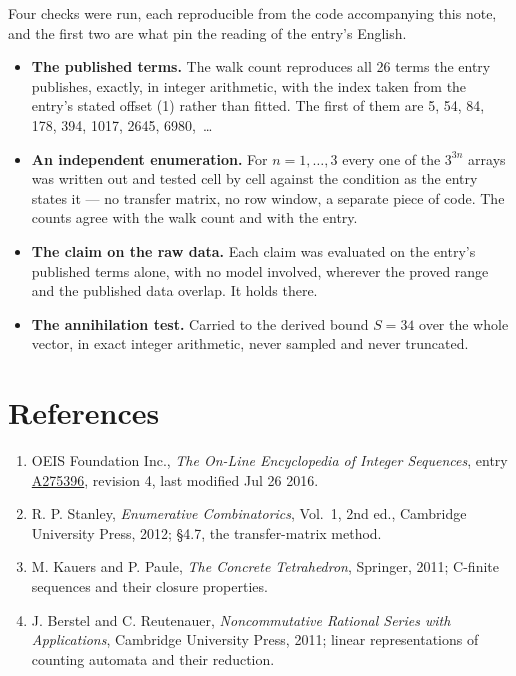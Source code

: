 \documentclass[11pt]{article}
\theoremstyle{definition}
\begin{document}
Four checks were run, each reproducible from the code accompanying this note, and the first two are what pin the reading of the entry's English.

\begin{itemize}

\item {\bfseries The published terms.} The walk count reproduces all 26 terms the entry publishes, exactly, in integer arithmetic, with the index taken from the entry's stated offset (1) rather than fitted. The first of them are 5, 54, 84, 178, 394, 1017, 2645, 6980,~\dots

\item {\bfseries An independent enumeration.} For $n = 1,\dots,3$ every one of the $3^{3n}$ arrays was written out and tested cell by cell against the condition as the entry states it --- no transfer matrix, no row window, a separate piece of code. The counts agree with the walk count and with the entry.

\item {\bfseries The claim on the raw data.} Each claim was evaluated on the entry's published terms alone, with no model involved, wherever the proved range and the published data overlap. It holds there.

\item {\bfseries The annihilation test.} Carried to the derived bound $S = 34$ over the whole vector, in exact integer arithmetic, never sampled and never truncated.

\end{itemize}

\section{References}

\begin{enumerate}

\item OEIS Foundation Inc., \emph{The On-Line Encyclopedia of Integer Sequences}, entry \href{https://oeis.org/A275396}{A275396}, revision 4, last modified Jul 26 2016.

\item R. P. Stanley, \emph{Enumerative Combinatorics}, Vol.~1, 2nd ed., Cambridge University Press, 2012; \S4.7, the transfer-matrix method.

\item M. Kauers and P. Paule, \emph{The Concrete Tetrahedron}, Springer, 2011; C-finite sequences and their closure properties.

\item J. Berstel and C. Reutenauer, \emph{Noncommutative Rational Series with Applications}, Cambridge University Press, 2011; linear representations of counting automata and their reduction.

\end{enumerate}
\end{document}
